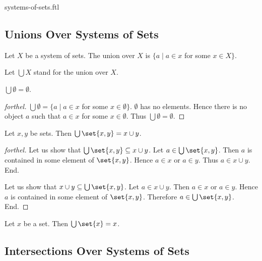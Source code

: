 \documentclass{naproche-library}
\begin{document}
\begin{smodule}{systems-of-sets.ftl}
  \subsection*{Unions Over Systems of Sets}

  \begin{definition}[forthel,id=FOUNDATIONS_10_541772562300928,printid]
    Let $X$ be a system of sets.
    The union over $X$ is $\{ a \mid a \in x$ for some $x \in X \}$.

    Let $\bigcup X$ stand for the union over $X$.
  \end{definition}

  \begin{proposition}[forthel,id=FOUNDATIONS_10_4872701241982976,printid]
    $\bigcup \emptyset = \emptyset$.
  \end{proposition}
  \begin{proof}[forthel]
    $\bigcup \emptyset = \{ a \mid a \in x$ for some $x \in \emptyset \}$.
    $\emptyset$ has no elements.
    Hence there is no object $a$ such that $a \in x$ for some $x \in \emptyset$.
    Thus $\bigcup \emptyset = \emptyset$.
  \end{proof}

  \begin{proposition}[forthel,id=FOUNDATIONS_10_2559541585641472,printid]
    Let $x, y$ be sets.
    Then $\bigcup \set{x, y} = x \cup y$.
  \end{proposition}
  \begin{proof}[forthel]
    Let us show that $\bigcup \set{x, y} \subseteq x \cup y$.
      Let $a \in \bigcup \set{x, y}$.
      Then $a$ is contained in some element of $\set{x, y}$.
      Hence $a \in x$ or $a \in y$.
      Thus $a \in x \cup y$.
    End.

    Let us show that $x \cup y \subseteq \bigcup \set{x, y}$.
      Let $a \in x \cup y$.
      Then $a \in x$ or $a \in y$.
      Hence $a$ is contained in some element of $\set{x, y}$.
      Therefore $a \in \bigcup \set{x, y}$.
    End.
  \end{proof}

  \begin{corollary}[forthel,id=FOUNDATIONS_10_2157223832715264,printid]
    Let $x$ be a set.
    Then $\bigcup \set{x} = x$.
  \end{corollary}


  \subsection*{Intersections Over Systems of Sets}


\end{smodule}
\end{document}
